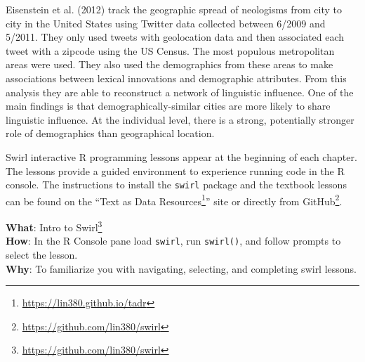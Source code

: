 \documentclass[
  letterpaper,
]{scrbook}
\DeclareRobustCommand{\href}[2]{#2\footnote{\url{#1}}}
\begin{document}
\begin{tcolorbox}[enhanced jigsaw, title=\textcolor{quarto-callout-caution-color}{\faFire}\hspace{0.5em}{Case study}, breakable, colback=white, colframe=quarto-callout-caution-color-frame, bottomrule=.15mm, left=2mm, bottomtitle=1mm, colbacktitle=quarto-callout-caution-color!10!white, opacityback=0, arc=.35mm, toprule=.15mm, coltitle=black, leftrule=.75mm, opacitybacktitle=0.6, toptitle=1mm, titlerule=0mm, rightrule=.15mm]

Eisenstein et al. (2012) track the geographic spread of neologisms from
city to city in the United States using Twitter data collected between
6/2009 and 5/2011. They only used tweets with geolocation data and then
associated each tweet with a zipcode using the US Census. The most
populous metropolitan areas were used. They also used the demographics
from these areas to make associations between lexical innovations and
demographic attributes. From this analysis they are able to reconstruct
a network of linguistic influence. One of the main findings is that
demographically-similar cities are more likely to share linguistic
influence. At the individual level, there is a strong, potentially
stronger role of demographics than geographical location.

\end{tcolorbox}

Swirl interactive R programming lessons appear at the beginning of each
chapter. The lessons provide a guided environment to experience running
code in the R console. The instructions to install the \texttt{swirl}
package and the textbook lessons can be found on the
``\href{https://lin380.github.io/tadr}{Text as Data Resources}'' site or
directly from \href{https://github.com/lin380/swirl}{GitHub}.

\begin{tcolorbox}[enhanced jigsaw, title=\textcolor{quarto-callout-tip-color}{\faLightbulb}\hspace{0.5em}{Swirl}, breakable, colback=white, colframe=quarto-callout-tip-color-frame, bottomrule=.15mm, left=2mm, bottomtitle=1mm, colbacktitle=quarto-callout-tip-color!10!white, opacityback=0, arc=.35mm, toprule=.15mm, coltitle=black, leftrule=.75mm, opacitybacktitle=0.6, toptitle=1mm, titlerule=0mm, rightrule=.15mm]

\textbf{What}: \href{https://github.com/lin380/swirl}{Intro to Swirl}\\
\textbf{How}: In the R Console pane load \texttt{swirl}, run
\texttt{swirl()}, and follow prompts to select the lesson.\\
\textbf{Why}: To familiarize you with navigating, selecting, and
completing swirl lessons.

\end{tcolorbox}
\end{document}

